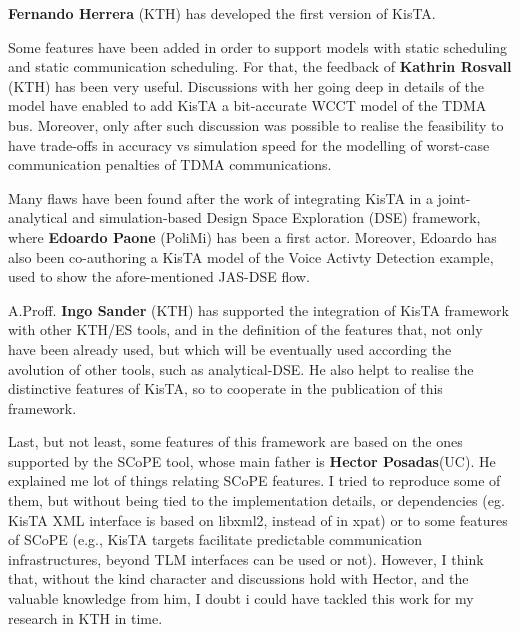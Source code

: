 \textbf{Fernando Herrera} (KTH) has developed the first version of KisTA.

Some features have been added in order to support models with static scheduling and static communication scheduling. For that, the feedback of \textbf{Kathrin Rosvall} (KTH) has been very useful. Discussions with her going deep in details of the model have enabled to add KisTA a bit-accurate WCCT model of the TDMA bus. Moreover, only after such discussion was possible to realise the feasibility to have trade-offs in accuracy vs simulation speed for the modelling of worst-case communication penalties of TDMA communications.

Many flaws have been found after the work of integrating KisTA in a joint-analytical and simulation-based Design Space Exploration (DSE) framework, where \textbf{Edoardo Paone} (PoliMi) has been a first actor. Moreover, Edoardo has also been co-authoring a KisTA model of the Voice Activty Detection example, used to show the afore-mentioned JAS-DSE flow.

A.Proff. \textbf{Ingo Sander} (KTH) has supported the integration of KisTA framework with other KTH/ES tools, and in the definition of the features that, not only have been already used, but which will be eventually used according the avolution of other tools, such as analytical-DSE. He also helpt to realise the distinctive features of KisTA, so to cooperate in the publication of this framework. 

Last, but not least, some features of this framework are based on the ones supported by the SCoPE tool, whose main father is \textbf{Hector Posadas}(UC). He explained me lot of things relating SCoPE features. I tried to reproduce some of them, but without being tied to the implementation details, or dependencies (eg. KisTA XML interface is based on libxml2, instead of in xpat)  or to some features of SCoPE (e.g., KisTA targets facilitate predictable communication infrastructures, beyond TLM interfaces can be used or not). 
However, I think that, without the kind character and discussions hold with Hector, and the valuable knowledge from him, I doubt i could have tackled this work for my research in KTH in time.


